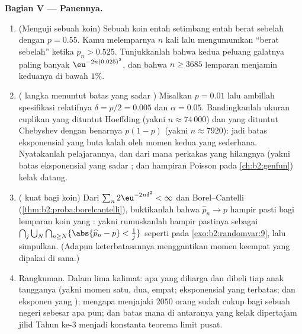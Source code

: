 \begin{problem}
\medskip
\noindent\textbf{Bagian V --- Panennya.}
\begin{enumerate}[resume]
  \item (Menguji sebuah koin) Sebuah koin entah setimbang entah berat sebelah dengan
        $p = 0.55$. Kamu melemparnya $n$ kali lalu mengumumkan
        ``berat sebelah'' ketika $\widehat p_n > 0.525$. Tunjukkanlah bahwa
        kedua peluang galatnya paling banyak
        $\eu^{-2n(0.025)^2}$, dan bahwa $n \geq 3685$ lemparan
        menjamin keduanya di bawah $1\%$.
  \item ( langka menuntut batas yang sadar ) Misalkan $p =
        0.01$ lalu ambillah spesifikasi relatifnya $\delta =
        p/2 = 0.005$ dan $\alpha = 0.05$. Bandingkanlah ukuran
        cuplikan yang dituntut Hoeffding (yakni $n \approx 74\,000$) dan
        yang dituntut Chebyshev dengan  benarnya $p(1-p)$ (yakni $n
        \approx 7920$): jadi batas eksponensial yang buta 
        kalah oleh momen kedua yang sederhana. Nyatakanlah pelajarannya,
        dan dari mana perkakas yang hilangnya (yakni batas
        eksponensial yang sadar ; dan hampiran Poisson pada
        \cref{ch:b2:genfun}) kelak datang.
  \item ( kuat bagi koin) Dari $\sum_n
        2\eu^{-2n\delta^2} < \infty$ dan Borel--Cantelli
        (\cref{thm:b2:proba:borelcantelli}), buktikanlah bahwa
        $\widehat p_n \to p$ hampir pasti bagi lemparan koin yang : yakni rumuskanlah  hampir pastinya sebagai
        $\bigcap_j\bigcup_N\bigcap_{n\geq N}
        \{\abs{\widehat p_n - p} < \tfrac1j\}$ seperti pada
        \cref{exo:b2:randomvar:9}, lalu simpulkan. (Adapun keterbatasannya
        menggantikan momen keempat yang dipakai di sana.)
  \item Rangkuman. Dalam lima kalimat: apa yang diharga dan dibeli tiap anak
        tangganya (yakni momen satu, dua, empat; eksponensial yang terbatas;
        dan eksponen yang ); mengapa menjajaki $2050$
        orang sudah cukup bagi sebuah negeri sebesar apa pun; dan
        batas mana di antaranya yang kelak dipertajam jilid Tahun ke-3 menjadi
        konstanta  teorema limit pusat.

\end{enumerate}
\end{problem}
